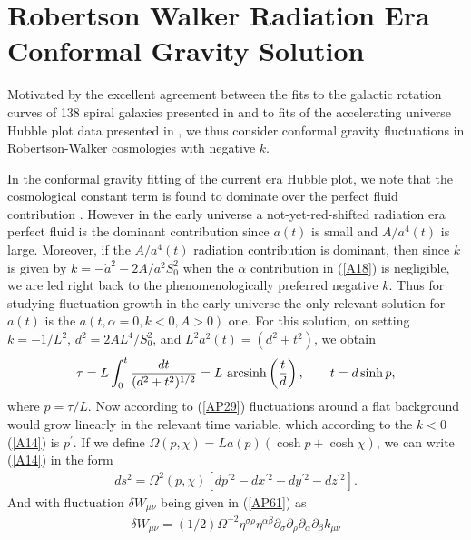 \section{Robertson Walker Radiation Era Conformal Gravity Solution}
\label{s:rw_radiation_conformal_gravity_sol}

Motivated by the excellent agreement between the fits to the galactic rotation curves of 138 spiral galaxies presented in \cite{mannheim_2011,mannheim_2012, obrien_mannheim_2012} and to fits of the accelerating universe Hubble plot data presented in \cite{mannheim_2006,mannheim_2017}, we thus consider conformal gravity fluctuations in Robertson-Walker cosmologies with negative $k$.

In the conformal gravity fitting of the current era Hubble plot, we note that the cosmological constant term is found to dominate over the perfect fluid contribution \cite{mannheim_1990}. However in the early universe a not-yet-red-shifted radiation era perfect fluid is the dominant contribution since $a(t)$ is small and $A/a^4(t)$ is large. Moreover, if the $A/a^4(t)$ radiation contribution is dominant, then since $k$ is given by $k=-\dot{a}^2-2A/a^2S_0^2$ when the $\alpha$ contribution in (\ref{A18}) is negligible, we are led right back to the phenomenologically preferred negative $k$. Thus for studying fluctuation growth in the early universe the only relevant solution for $a(t)$ is the $a(t,\alpha=0,k<0,A>0)$ one. For this solution, on setting $k=-1/L^2$, $d^2=2AL^4/S_0^2$, and $L^2a^2(t)=(d^2+t^2)$, we obtain
%
\begin{eqnarray}
\tau=L\int_0^t \frac{dt}{(d^2+t^2)^{1/2}}=L~{\rm arc sinh}\left(\frac{t}{d}\right),\qquad t=d\sinh p,
\label{B1}
\end{eqnarray}
%
where $p=\tau/L$. Now according to (\ref{AP29}) fluctuations around a flat background would grow linearly in the relevant time variable, which according to the $k<0$ (\ref{A14}) is $p^{\prime}$. If we define $\Omega(p,\chi)=La(p)(\cosh p+\cosh \chi)$, we can write (\ref{A14}) in the form
%
\begin{eqnarray}
ds^2=\Omega^2(p,\chi)\left[dp^{\prime 2}-dx^{\prime 2} -dy^{\prime 2} -dz^{\prime 2}\right].
\label{B2}
\end{eqnarray}
%
And with fluctuation $\delta W_{\mu\nu}$ being given in (\ref{AP61}) as 
%
\begin{eqnarray}
\delta W_{\mu\nu}=(1/2)\Omega^{-2}\eta^{\sigma\rho}\eta^{\alpha\beta}\partial_{\sigma}\partial_{\rho} \partial_{\alpha}\partial_{\beta}k_{\mu\nu}
\end{eqnarray}
